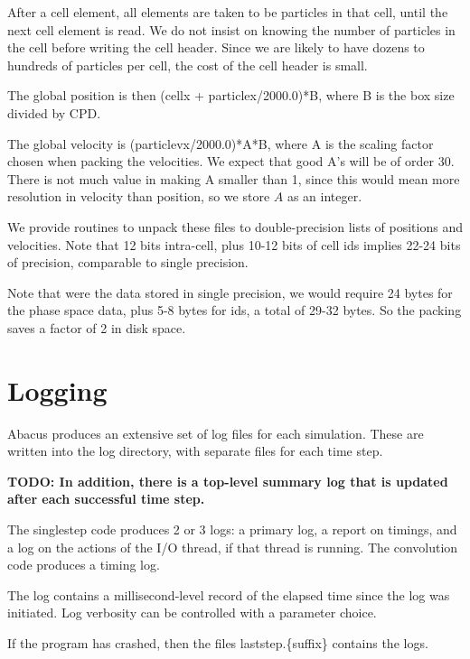 \documentclass[11pt,preprint]{aastex}
\newcommand{\todo}[1]{{\bf TODO: #1}}
\begin{document}
After a cell element, all elements are taken to be particles in
that cell, until the next cell element is read.  We do not insist
on knowing the number of particles in the cell before writing the
cell header.  Since we are likely to have dozens to hundreds of
particles per cell, the cost of the cell header is small.

The global position is then (cellx + particlex/2000.0)*B, where B
is the box size divided by CPD.  

The global velocity is (particlevx/2000.0)*A*B, where A is the
scaling factor chosen when packing the velocities.  We expect
that good A's will be of order 30.  There is not much value in 
making A smaller than 1, since this would mean more resolution 
in velocity than position, so we store $A$ as an integer. 

We provide routines to unpack these files to double-precision lists of
positions and velocities.  Note that 12 bits intra-cell, plus 10-12 bits
of cell ids implies 22-24 bits of precision, comparable to single precision.

Note that were the data stored in single precision, we would require
24 bytes for the phase space data, plus 5-8 bytes for ids, a total of 
29-32 bytes.  So the packing saves a factor of 2 in disk space.

\section{Logging}

Abacus produces an extensive set of log files for each simulation.
These are written into the log directory, with separate files for
each time step. 

\todo{In addition, there is a top-level summary log that is updated
after each successful time step.}

The singlestep code produces 2 or 3 logs: a primary log, a report
on timings, and a log on the actions of the I/O thread, if that
thread is running.  The convolution code produces a timing log.

The log contains a millisecond-level record of the elapsed time
since the log was initiated.  Log verbosity can be controlled with
a parameter choice.

If the program has crashed, then the files laststep.\{suffix\} contains
the logs.
\end{document}
